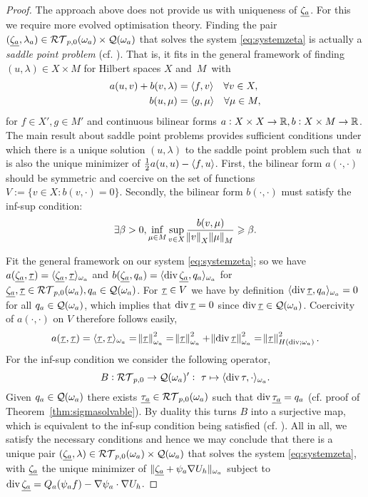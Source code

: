 \documentclass[thesis.tex]{subfiles}
\begin{document}
\begin{proof}
  The approach above does not provide us with uniqueness of $\underline{\zeta_a}$. For this we require more evolved optimisation theory. 
  Finding the pair $(\underline{\zeta_a}, {{\lambda_a}}) \in \mathcal{RT}_{p,0}(\omega_a) \times \mathcal{Q}(\omega_a)$ that solves the system 
  \eqref{eq:systemzeta} is actually a \emph{saddle point problem} (cf. \cite{brezzimixed, braess2007finite}).
  That is, it fits in the general framework of finding $(u, \lambda) \in X \times M$ for Hilbert spaces $X$ and~$M$~with
    \begin{align*}
      a(u,v) + b(v,\lambda) &= \langle f,v \rangle \quad \forall v \in X,\\
      b(u, \mu) &= \langle g,\mu \rangle \quad \forall \mu \in M,
    \end{align*}
    for $f \in X', g \in M'$ and continuous bilinear forms $a: X \times X \to \mathbb{R}, b : X \times M \to \mathbb{R}$.
    The main result about saddle point problems \cite[Thm~4.3]{braess2007finite} provides sufficient conditions under which there 
    is a unique solution $(u, \lambda)$ to the saddle point problem such that~$u$ is also the unique minimizer of 
    $\frac{1}{2} a(u,u) - \langle f,u \rangle$. First, the bilinear form $a(\cdot, \cdot)$ should be symmetric and coercive on
    the set of functions $V := \{v \in X : b(v, \cdot) = 0\}$.
    Secondly, the bilinear form $b(\cdot, \cdot)$ must satisfy the inf-sup condition: 
    \[
      \exists \beta > 0, \inf_{\mu \in M} \sup_{v \in X}\frac{b(v,\mu)}{\norm{v}_X \norm{\mu}_M} \geqslant \beta.
    \]

    Fit the general framework on our system \eqref{eq:systemzeta}; so we 
    have $a(\underline{\zeta_a},\underline{\tau}) = \langle \underline{\zeta_a},\underline{\tau} \rangle_{\omega_a}$ and $b(\underline{\zeta_a},q_a) = \langle \operatorname{div} \underline{\zeta_a},q_a \rangle_{\omega_a}$ for $\underline{\zeta_a}, \underline{\tau} \in \mathcal{RT}_{p,0}(\omega_a), q_a \in \mathcal{Q}(\omega_a)$. For $\underline{\tau} \in V$ we have by definition $\langle \operatorname{div} \underline{\tau}, q_a \rangle_{\omega_a} = 0$ for all $q_a \in \mathcal{Q}(\omega_a)$, which implies that $\operatorname{div} \underline{\tau} = 0$ since $\operatorname{div} \underline{\tau} \in \mathcal{Q}(\omega_a)$. Coercivity of  $a(\cdot, \cdot)$ on $V$ therefore follows easily,
    \[
      a(\underline{\tau},\underline{\tau}) = \langle \underline{\tau},\underline{\tau} \rangle_{\omega_a} = \norm{\underline{\tau}}^2_{\omega_a} = \norm{\underline{\tau}}^2_{\omega_a} + \norm{\operatorname{div} \underline{\tau}}^2_{\omega_a} = \norm{\underline{\tau}}^2_{H(\operatorname{div}; \omega_a)}.
    \]
    For the inf-sup condition we consider the following operator,
    \[
      B : \mathcal{RT}_{p,0} \to \mathcal{Q}(\omega_a)' : \, \, \tau \mapsto \langle \operatorname{div} \tau, \cdot \rangle_{\omega_a}.
    \]
    Given $q_a \in \mathcal{Q}(\omega_a)$ there exists $ \underline{\tau_a} \in \mathcal{RT}_{p,0}(\omega_a)$  such that 
    $\operatorname{div}  \underline{\tau_a} = q_a$ (cf. proof of Theorem~\ref{thm:sigmasolvable}).
    By duality this turns $B$ into a surjective map,
    which is equivalent to the inf-sup condition being satisfied (cf. \cite[Thm~4.2.1]{brezzimixed}).
    All in all, we satisfy the necessary conditions and hence we may conclude that there is a unique pair 
    $(\underline{\zeta_a}, \lambda) \in \mathcal{RT}_{p,0}(\omega_a) \times \mathcal{Q}(\omega_a)$ 
    that solves the system \eqref{eq:systemzeta}, with $\underline{\zeta_a}$ the
    unique minimizer of $\| \underline{\zeta_a }+ \psi_a \nabla U_h \|_{\omega_a}$ subject to $\operatorname{div} \underline{\zeta_a} = Q_a(\psi_a f) - \nabla \psi_a \cdot \nabla U_h$.
\end{proof}
\end{document}
